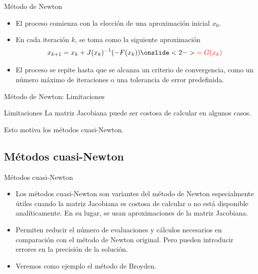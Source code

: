 \documentclass[a4paper,10pt]{beamer}
\begin{document}
\begin{frame}{Método de Newton}
	\begin{itemize}
		\item El proceso comienza con la elección de una aproximación inicial $x_0$.
		\item En cada iteración $k$, se toma como la siguiente aproximación 
		\begin{equation*}
			x_{k+1} = x_{k} + J(x_{k})^{-1}(-F(x_k)) \onslide<2->{\textcolor{red}{ =G(x_k)}}
		\end{equation*}
		\item El proceso se repite hasta que se alcanza un criterio de convergencia, como un número máximo de iteraciones o una tolerancia de error predefinida.	
	\end{itemize}

\end{frame}

\begin{frame}{Método de Newton: Limitaciones}
	\begin{block}{Limitaciones}
		La matriz Jacobiana puede ser costosa de calcular en algunos casos.
	\end{block}
	
	Esto motiva los métodos cuasi-Newton.
\end{frame}

\subsection{Métodos cuasi-Newton}
\begin{frame}{Métodos cuasi-Newton}

\begin{itemize}
	\item Los métodos cuasi-Newton son variantes del método de Newton especialmente útiles cuando la matriz Jacobiana es costosa de calcular o no está disponible analíticamente. En su lugar, se usan aproximaciones de la matriz Jacobiana.
	\pause
	\item Permiten reducir el número de evaluaciones y cálculos necesarios en comparación con el método de Newton original. Pero pueden introducir errores en la precisión de la solución.
	\pause
	\item Veremos como ejemplo el método de Broyden.
\end{itemize}

\end{frame}
\end{document}
